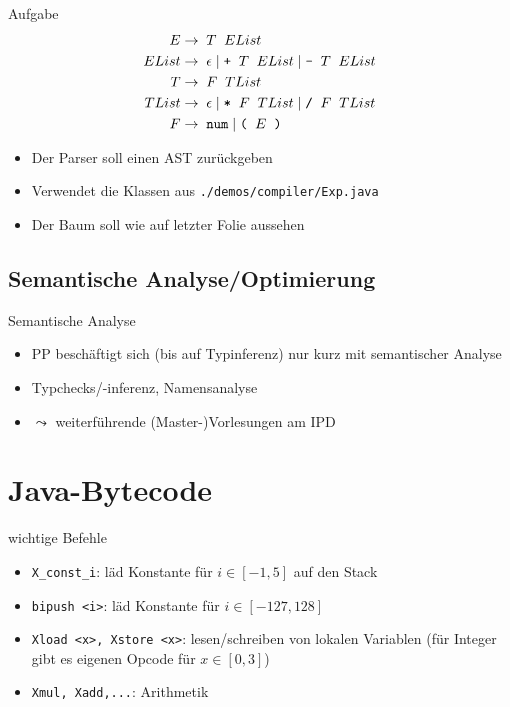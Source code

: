 \documentclass{beamer}
\begin{document}
\begin{frame}{Aufgabe}
	\footnotesize
	\begin{align*}
		E     \to & \;\; T \;\; EList\\
		EList \to & \;\; \epsilon \mid \textrm{\texttt{+}} \;\; T \;\; EList \mid \textrm{\texttt{-}} \;\; T \;\; EList\\
		T     \to & \;\; F \;\; TList\\
		TList \to & \;\; \epsilon \mid \textrm{\texttt{*}} \;\; F \;\; TList \mid \textrm{\texttt{/}} \;\; F \;\; TList\\
		F \to & \;\; \textrm{\texttt{num}} \; | \; \textrm{\texttt{(}} \;\; E \;\; \textrm{\texttt{)}}
	\end{align*}
	\begin{itemize}
            \item Der Parser soll einen AST zurückgeben
		\item Verwendet die Klassen aus \texttt{./demos/compiler/Exp.java}
            \item Der Baum soll wie auf letzter Folie aussehen
	\end{itemize}
\end{frame}

\subsection{Semantische Analyse/Optimierung}

\begin{frame}{Semantische Analyse}
	\begin{itemize}
		\item PP beschäftigt sich (bis auf Typinferenz) nur kurz mit semantischer Analyse
		\item Typchecks/-inferenz, Namensanalyse
		\item $\leadsto$ weiterführende (Master-)Vorlesungen am IPD
	\end{itemize}
\end{frame}

\section{Java-Bytecode}

\begin{frame}{wichtige Befehle}
    \begin{itemize}
        \item \texttt{X\_const\_i}: läd Konstante für $i \in [-1,5]$ auf den Stack
        \item \texttt{bipush <i>}: läd Konstante für $i \in [-127,128]$
        \item \texttt{Xload <x>, Xstore <x>}: lesen/schreiben von lokalen Variablen (für Integer gibt es eigenen Opcode für $x \in [0,3]$)
        \item \texttt{Xmul, Xadd,...}: Arithmetik
    \end{itemize}
\end{frame}
\end{document}
